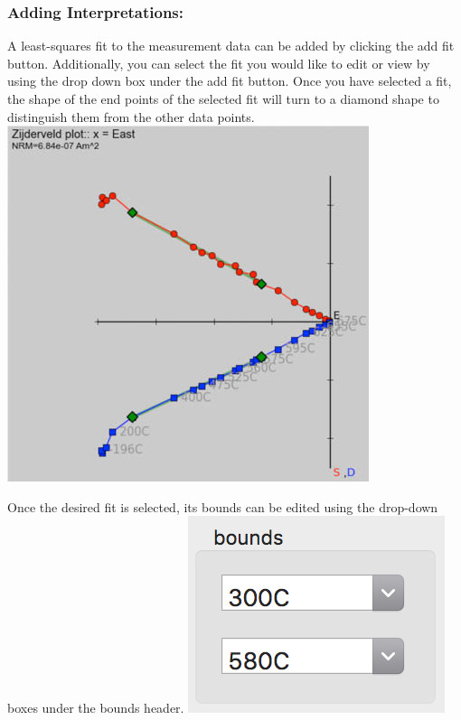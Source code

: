 \subsubsection{Adding Interpretations:}\label{adding-interpretations}

A least-squares fit to the measurement data can be added by clicking the
add fit button. Additionally, you can select the fit you would like to
edit or view by using the drop down box under the add fit button. Once
you have selected a fit, the shape of the end points of the selected fit
will turn to a diamond shape to distinguish them from the other data
points.\\
\includegraphics{./images/Fit.jpg}

Once the desired fit is selected, its bounds can be edited using the
drop-down boxes under the bounds header.
\includegraphics{./images/BoundsBox.png}

